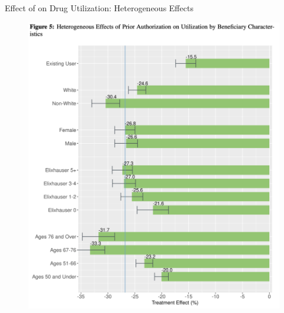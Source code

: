 \begin{frame}{Effect of on Drug Utilization: Heterogeneous Effects}
    \begin{figure}
        \centering
        \includegraphics[width=0.5\linewidth]{fig5.png}

    \end{figure}
\end{frame}